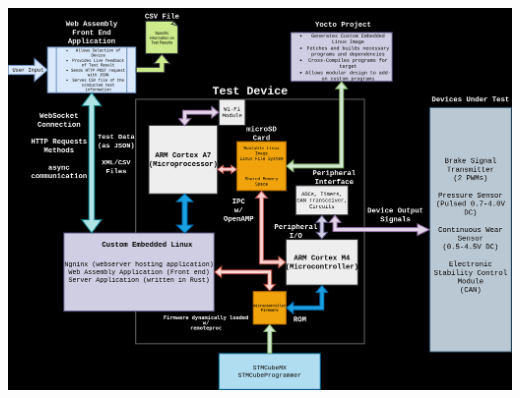 \documentclass[12pt]{article}
\begin{document}
\includegraphics[width=\textwidth]{../assets/block_diagram.png}
\end{document}
